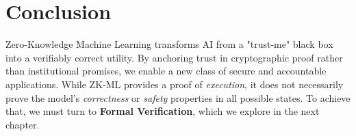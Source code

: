\section{Conclusion}
\label{sec:conclusion_zkml_ch19}

Zero-Knowledge Machine Learning transforms AI from a "trust-me" black box into a verifiably correct utility. By anchoring trust in cryptographic proof rather than institutional promises, we enable a new class of secure and accountable applications. While ZK-ML provides a proof of \textit{execution}, it does not necessarily prove the model's \textit{correctness} or \textit{safety} properties in all possible states. To achieve that, we must turn to \textbf{Formal Verification}, which we explore in the next chapter.


